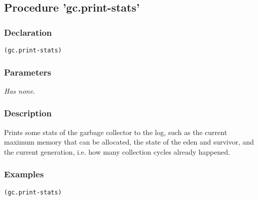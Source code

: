 \subsection{Procedure 'gc.print-stats'}
\label{builtins/gc.print-stats}

\subsubsection*{Declaration}
\begin{lstlisting}
(gc.print-stats)
\end{lstlisting}

\subsubsection*{Parameters}
\textit{Has none.}

\subsubsection*{Description}
Prints some stats of the garbage collector to the log, such as the current maximum memory that can be allocated, the state of the eden and survivor, and the current generation, i.e. how many collection cycles already happened.

\subsubsection*{Examples}
\begin{lstlisting}
(gc.print-stats)
\end{lstlisting}
